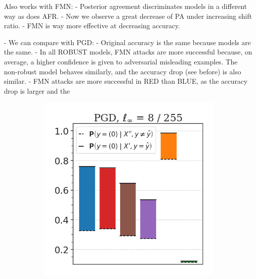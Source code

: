 Also works with FMN:
- Posterior agreement discriminates models in a different way as does AFR.
- Now we observe a great decrease of PA under increasing shift ratio.
- FMN is way more effective at decreasing accuracy.


- We can compare with PGD:
    - Original accuracy is the same because models are the same.
    - In all ROBUST models, FMN attacks are more successful because, on average, a higher confidence is given to adversarial misleading examples. The non-robust model behaves similarly, and the accuracy drop (see before) is also similar.
    - FMN attacks are more successful in RED than BLUE, as the accuracy drop is larger and the

\begin{figure}[H]
    \centering
    \begin{subfigure}[b]{0.49\textwidth}
        \centering
        \includegraphics[width=\textwidth]{img/results_discussion/adversarial/DIFF_PGD_0.0314.png}
    \end{subfigure}
    \hfill
    \begin{subfigure}[b]{0.49\textwidth}
        \centering

\end{subfigure}
\end{figure}

